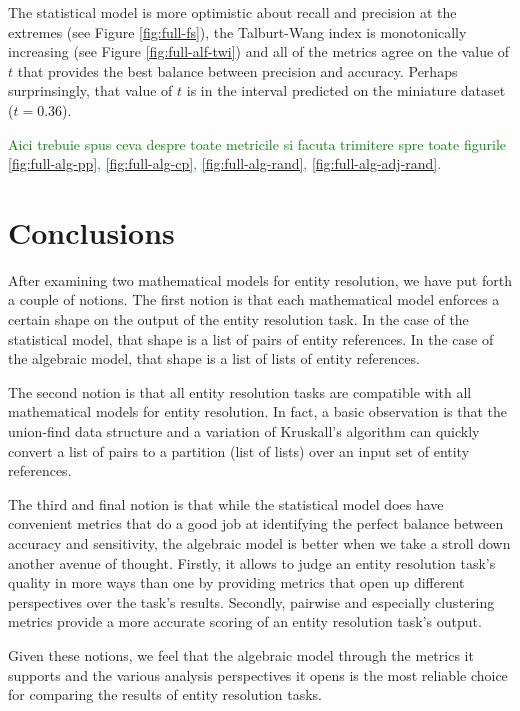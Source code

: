 \documentclass[lettersize,journal]{IEEEtran}
\begin{document}
    The statistical model is more optimistic about recall and precision at the
    extremes (see Figure \ref{fig:full-fs}), the Talburt-Wang index is monotonically increasing (see Figure \ref{fig:full-alf-twi}) and all of the
    metrics agree on the value of $t$ that provides the best balance between
    precision and accuracy. 
    Perhaps surprinsingly, that value of $t$ is in the interval predicted on the
    miniature dataset ($t=0.36$).

    \textcolor{green}{Aici trebuie spus ceva despre toate metricile si facuta trimitere spre toate figurile \ref{fig:full-alg-pp}, \ref{fig:full-alg-cp}, \ref{fig:full-alg-rand}, \ref{fig:full-alg-adj-rand}.}


    \section[conclusion]{Conclusions}
    \label{section:conclusions}

    After examining two mathematical models for entity resolution, we have put
    forth a couple of notions.
    The first notion is that each mathematical model enforces a certain shape
    on the output of the entity resolution task.
    In the case of the statistical model, that shape is a list of pairs of
    entity references.
    In the case of the algebraic model, that shape is a list of lists of entity
    references.

    The second notion is that all entity resolution tasks are compatible with
    all mathematical models for entity resolution.
    In fact, a basic observation is that the union-find data structure and a
    variation of Kruskall's algorithm can quickly convert a list of pairs to a
    partition (list of lists) over an input set of entity references.
    
    The third and final notion is that while the statistical model does have
    convenient metrics that do a good job at identifying the perfect balance
    between accuracy and sensitivity, the algebraic model is better when we take
    a stroll down another avenue of thought.
    Firstly, it allows to judge an entity resolution task's quality in more ways
    than one by providing metrics that open up different perspectives over the
    task's results.
    Secondly, pairwise and especially clustering metrics provide a more accurate
    scoring of an entity resolution task's output.
    
    Given these notions, we feel that the algebraic model through the metrics it
    supports and the various analysis perspectives it opens is the most reliable
    choice for comparing the results of entity resolution tasks.
\end{document}

